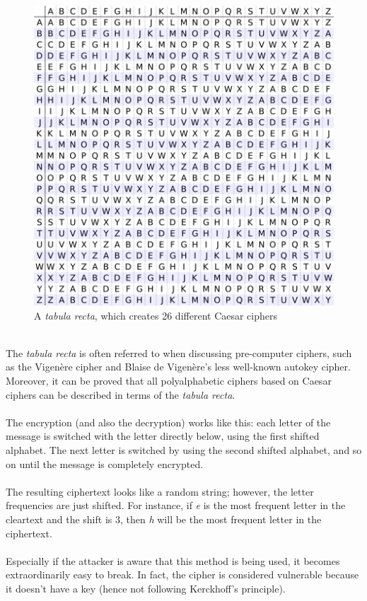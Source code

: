 \documentclass[Lau,binding=0.6cm,oneside]{sapthesis}
\begin{document}
\begin{figure}[H]
\includegraphics[scale=0.4]{tabula_recta}
\centering
\caption{A \textit{tabula recta}, which creates 26 different Caesar ciphers}
\centering
\end{figure}

\ \\

The \textit{tabula recta} is often referred to when discussing pre-computer ciphers, such as the Vigenère cipher and Blaise de Vigenère's less well-known autokey cipher. Moreover, it can be proved that all polyalphabetic ciphers based on Caesar ciphers can be described in terms of the \textit{tabula recta}.\\\\
The encryption (and also the decryption) works like this: each letter of the message is switched with the letter directly below, using the first shifted alphabet. The next letter is switched by using the second shifted alphabet, and so on until the message is completely encrypted.\\\\
The resulting ciphertext looks like a random string; however, the letter frequencies are just shifted. For instance, if \textit{e} is the most frequent letter in the cleartext and the shift is 3, then \textit{h} will be the most frequent letter in the ciphertext.\\\\
Especially if the attacker is aware that this method is being used, it becomes extraordinarily easy to break. In fact, the cipher is considered vulnerable because it doesn't have a key (hence not following Kerckhoff's principle).
\end{document}
